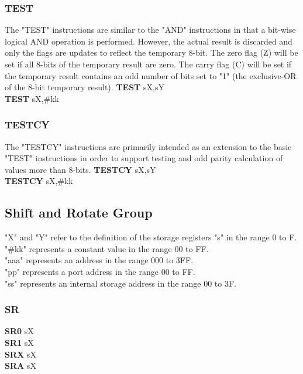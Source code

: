                         \subsubsection{TEST}
                        The "TEST" instructions are similar to the "AND" instructions in that a bit-wise logical AND operation is performed. However, the actual result is discarded and
                        only the flags are updates to reflect the temporary 8-bit. The zero flag (Z) will be set if all 8-bits of the temporary result are zero.
                        The carry flag (C) will be set if the temporary result contains an odd number of bits set to "1" (the exclusive-OR of the 8-bit temporary result).
                            \textbf{TEST} sX,sY\\
                            \textbf{TEST} sX,\#kk\\
                        \subsubsection{TESTCY}
                        The "TESTCY" instructions are primarily intended as an extension to the basic "TEST" instructions in order to support testing and odd parity calculation of
                        values more than 8-bits.
                            \textbf{TESTCY} sX,sY\\
                            \textbf{TESTCY} sX,\#kk\\
                \subsection{Shift and Rotate Group}
                "X" and "Y" refer to the definition of the storage registers "s" in the range 0 to F.\\
                "\#kk" represents a constant value in the range 00 to FF.\\
                "aaa" represents an address in the range 000 to 3FF.\\
                "pp" represents a port address in the range 00 to FF.\\
                "ss" represents an internal storage address in the range 00 to 3F.\\
                        \subsubsection{SR}
                            \textbf{SR0} sX\\
                            \textbf{SR1} sX\\
                            \textbf{SRX} sX\\
                            \textbf{SRA} sX\\
